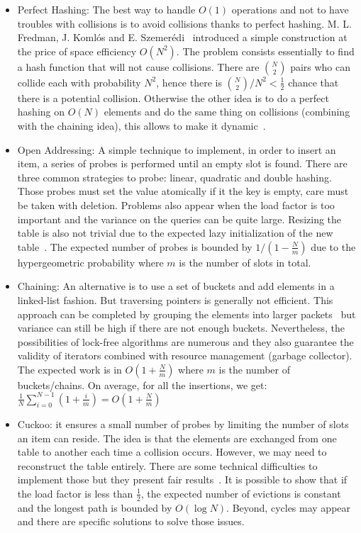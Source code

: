 \begin{itemize}
    \item Perfect Hashing: The best way to handle $O(1)$ operations and not to have troubles with collisions is to avoid collisions thanks to perfect hashing. M. L. Fredman, J. Komlós and E. Szemerédi~\cite{fredman1984storing} introduced a simple construction at the price of space efficiency $O(N^{2})$. The problem consists essentially to find a hash function that will not cause collisions. There are $\binom{N}{2}$ pairs who can collide each with probability $N^{2}$, hence there is $\binom{N}{2} / N^{2} < \frac{1}{2}$ chance that there is a potential collision. Otherwise the other idea is to do a perfect hashing on $O(N)$ elements and do the same thing on collisions (combining with the chaining idea), this allows to make it dynamic~\cite{dietzfelbinger1994dynamic}.
    \item Open Addressing: A simple technique to implement, in order to insert an item, a series of probes is performed until an empty slot is found. There are three common strategies to probe: linear, quadratic and double hashing. Those probes must set the value atomically if it the key is empty, care must be taken with deletion. Problems also appear when the load factor is too important and the variance on the queries can be quite large. Resizing the table is also not trivial due to the expected lazy initialization of the new table~\cite{gao2005lock}. The expected number of probes is bounded by $1/(1 - \frac{N}{m})$ due to the hypergeometric probability where $m$ is the number of slots in total.
    \item Chaining: An alternative is to use a set of buckets and add elements in a linked-list fashion. But traversing pointers is generally not efficient. This approach can be completed by grouping the elements into larger packets~\cite{ashkiani2017dynamic} but variance can still be high if there are not enough buckets. Nevertheless, the possibilities of lock-free algorithms are numerous and they also guarantee the validity of iterators combined with resource management (garbage collector). The expected work is in $O(1 + \frac{N}{m})$ where $m$ is the number of buckets/chains. On average, for all the insertions, we get: $\frac{1}{N} \sum_{i=0}^{N-1} (1 + \frac{i}{m}) = O(1 + \frac{N}{m})$
    \item Cuckoo: it ensures a small number of probes by limiting the number of slots an item can reside. The idea is that the elements are exchanged from one table to another each time a collision occurs. However, we may need to reconstruct the table entirely. There are some technical difficulties to implement those but they present fair results~\cite{alcantara2009real}. It is possible to show that if the load factor is less than $\frac{1}{2}$, the expected number of evictions is constant and the longest path is bounded by $O(\log N)$. Beyond, cycles may appear and there are specific solutions to solve those issues.
\end{itemize}



